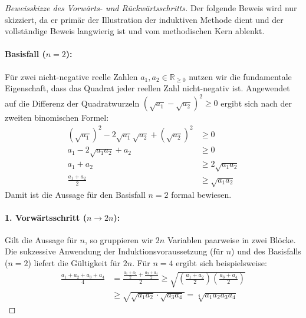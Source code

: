 \documentclass{article}
\theoremstyle{definition}
\begin{document}
\begin{proof}[Beweisskizze des Vorwärts- und Rückwärtsschritts]
\quad Der folgende Beweis wird nur skizziert, da er primär der Illustration der induktiven Methode dient und der vollständige Beweis langwierig ist und vom methodischen Kern ablenkt. 

\paragraph{Basisfall ($n=2$):} 
Für zwei nicht-negative reelle Zahlen $a_1, a_2 \in \mathbb{R}_{\ge 0}$ nutzen wir die fundamentale Eigenschaft, dass das Quadrat jeder reellen Zahl nicht-negativ ist. Angewendet auf die Differenz der Quadratwurzeln $(\sqrt{a_1} - \sqrt{a_2})^2 \ge 0$ ergibt sich nach der zweiten binomischen Formel:
\begin{align*}
    (\sqrt{a_1})^2 - 2\sqrt{a_1}\sqrt{a_2} + (\sqrt{a_2})^2 &\ge 0 \\
    a_1 - 2\sqrt{a_1 a_2} + a_2 &\ge 0 \\
    a_1 + a_2 &\ge 2\sqrt{a_1 a_2} \\
    \frac{a_1 + a_2}{2} &\ge \sqrt{a_1 a_2}
\end{align*}
Damit ist die Aussage für den Basisfall $n=2$ formal bewiesen.

\paragraph{1. Vorwärtsschritt ($n \rightarrow 2n$):}
Gilt die Aussage für $n$, so gruppieren wir $2n$ Variablen paarweise in zwei Blöcke. Die sukzessive Anwendung der Induktionsvoraussetzung (für $n$) und des Basisfalls ($n=2$) liefert die Gültigkeit für $2n$. Für $n=4$ ergibt sich beispielsweise:
\begin{align*}
    \frac{a_1 + a_2 + a_3 + a_4}{4} &= \frac{\frac{a_1+a_2}{2} + \frac{a_3+a_4}{2}}{2} \ge \sqrt{\left(\frac{a_1+a_2}{2}\right) \left(\frac{a_3+a_4}{2}\right)} \\
    &\ge \sqrt{\sqrt{a_1 a_2} \cdot \sqrt{a_3 a_4}} = \sqrt[4]{a_1 a_2 a_3 a_4}
\end{align*}


\end{proof}
\end{document}
